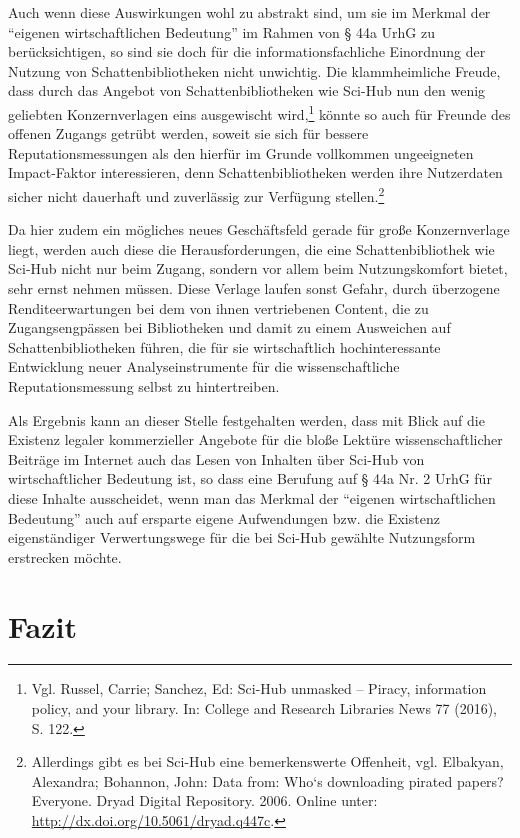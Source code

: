 \documentclass[a4paper,
fontsize=11pt,
oneside,
numbers=noperiodatend,
parskip=half-,
bibliography=totoc,
final
]{scrartcl}
\begin{document}
Auch wenn diese Auswirkungen wohl zu abstrakt sind, um sie im Merkmal
der \enquote{eigenen wirtschaftlichen Bedeutung} im Rahmen von § 44a
UrhG zu berücksichtigen, so sind sie doch für die informationsfachliche
Einordnung der Nutzung von Schattenbibliotheken nicht unwichtig. Die
klammheimliche Freude, dass durch das Angebot von Schattenbibliotheken
wie Sci-Hub nun den wenig geliebten Konzernverlagen eins ausgewischt
wird,\footnote{Vgl. Russel, Carrie; Sanchez, Ed: Sci-Hub unmasked --
  Piracy, information policy, and your library. In: College and Research
  Libraries News 77 (2016), S. 122.} könnte so auch für Freunde des
offenen Zugangs getrübt werden, soweit sie sich für bessere
Reputationsmessungen als den hierfür im Grunde vollkommen ungeeigneten
Impact-Faktor interessieren, denn Schattenbibliotheken werden ihre
Nutzerdaten sicher nicht dauerhaft und zuverlässig zur Verfügung
stellen.\footnote{Allerdings gibt es bei Sci-Hub eine bemerkenswerte
  Offenheit, vgl. Elbakyan, Alexandra; Bohannon, John: Data from: Who`s
  downloading pirated papers? Everyone. Dryad Digital Repository. 2006.
  Online unter: \url{http://dx.doi.org/10.5061/dryad.q447c}.}

Da hier zudem ein mögliches neues Geschäftsfeld gerade für große
Konzernverlage liegt, werden auch diese die Herausforderungen, die eine
Schattenbibliothek wie Sci-Hub nicht nur beim Zugang, sondern vor allem
beim Nutzungskomfort bietet, sehr ernst nehmen müssen. Diese Verlage
laufen sonst Gefahr, durch überzogene Renditeerwartungen bei dem von
ihnen vertriebenen Content, die zu Zugangsengpässen bei Bibliotheken und
damit zu einem Ausweichen auf Schattenbibliotheken führen, die für sie
wirtschaftlich hochinteressante Entwicklung neuer Analyseinstrumente für
die wissenschaftliche Reputationsmessung selbst zu hintertreiben.

Als Ergebnis kann an dieser Stelle festgehalten werden, dass mit Blick
auf die Existenz legaler kommerzieller Angebote für die bloße Lektüre
wissenschaftlicher Beiträge im Internet auch das Lesen von Inhalten über
Sci-Hub von wirtschaftlicher Bedeutung ist, so dass eine Berufung auf §
44a Nr. 2 UrhG für diese Inhalte ausscheidet, wenn man das Merkmal der
\enquote{eigenen wirtschaftlichen Bedeutung} auch auf ersparte eigene
Aufwendungen bzw. die Existenz eigenständiger Verwertungs­wege für die
bei Sci-Hub gewählte Nutzungsform erstrecken möchte.

\section{Fazit}\label{fazit}
\end{document}
